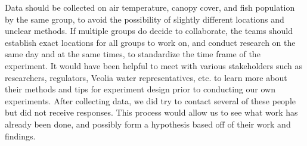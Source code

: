 \documentclass{article}
\begin{document}
Data should be collected on air temperature, canopy cover, and fish population by the same group, to avoid the possibility of slightly different locations and unclear methods. If multiple groups do decide to collaborate, the teams should establish exact locations for all groups to work on, and conduct research on the same day and at the same times, to standardize the time frame of the experiment. It would have been helpful to meet with various stakeholders such as researchers, regulators, Veolia water representatives, etc. to learn more about their methods and tips for experiment design prior to conducting our own experiments. After collecting data, we did try to contact several of these people but did not receive responses. This process would allow us to see what work has already been done, and possibly form a hypothesis based off of their work and findings.
\end{document}
